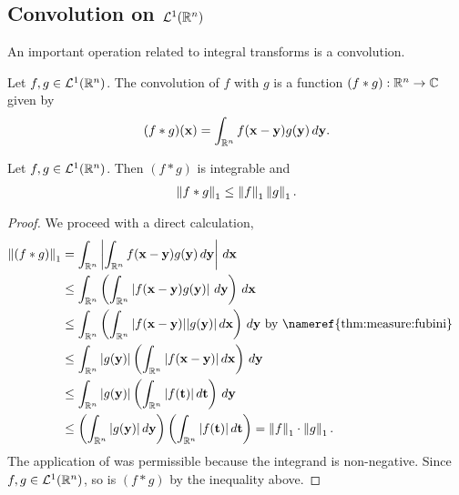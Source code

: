 \subsection{Convolution on ${\mathcal {L}^1}({\mathbb R}^n)$}
An important operation related to integral transforms is a convolution.
\begin{definition}
Let $f, g \in {\mathcal {L}^1}({\mathbb R}^n)$. The convolution of $f$ with $g$ is a function $(f \ast g) : {\mathbb R}^n \to \mathbb{C}$ given by
\begin{equation*}
    (f \ast g) (\mathbf{x}) = \int_{{\mathbb R}^n} f(\mathbf{x} - \mathbf{y})g(\mathbf{y}) \,d \mathbf{y}.
\end{equation*}
\end{definition}

\begin{lemma}
\label{prop:fourier:convnorm}
Let $f, g \in {\mathcal {L}^1}({\mathbb R}^n)$. Then $(f \ast g)$ is integrable and \begin{align*}
    \left\lVert f \ast g\right\rVert_1 \leq \left\lVert f\right\rVert_1 \left\lVert g\right\rVert_1. 
\end{align*}
\end{lemma}
\begin{proof} We proceed with a direct calculation,
     \begin{align*}
        \norm{(f \ast g)}_1 &= \int_{\R^n} \left | \int_{\R^n} f(\vec{x} - \vec{y})g(\vec{y}) \,d \vec{y} \right | \,d \vec{x} & \\
                                      &\leq \int_{\R^n} \left (  \int_{\R^n} \left | f(\vec{x} - \vec{y})g(\vec{y}) \right | \,d \vec{y} \right )  \,d \vec{x} & \\
                                      &\leq \int_{\R^n} \left ( \int_{\R^n} | f(\vec{x} - \vec{y})| |g(\vec{y}) | \,d \vec{x} \right)  \,d \vec{y} \text{ by \nameref{thm:measure:fubini}} \\
                                      &\leq \int_{\R^n} |g(\vec{y}) |  \left ( \int_{\R^n} | f(\vec{x} - \vec{y})| \,d \vec{x} \right)  \,d \vec{y} &  \\
                                      &\leq \int_{\R^n} |g(\vec{y}) |  \left ( \int_{\R^n} | f(\vec{t})| \,d \vec{t} \right)  \,d \vec{y} & \\
                                      &\leq \left (\int_{\R^n} |g(\vec{y})| \,d \vec{y} \right) \left( \int_{\R^n} | f(\vec{t})| \,d \vec{t} \right) = \norm{f}_1 \cdot \norm{g}_1.
    \end{align*}
The application of  was permissible because the integrand is non-negative. Since $f, g \in {\mathcal {L}^1}({\mathbb R}^n)$, so is $(f \ast g)$ by the inequality above.
\end{proof}
